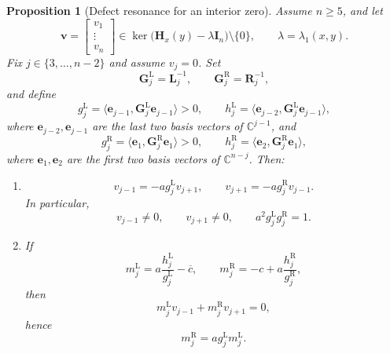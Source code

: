 \documentclass[11pt]{article}
\numberwithin{equation}{section}
\newtheorem{proposition}[theorem]{Proposition}
\begin{document}
\begin{proposition}[Defect resonance for an interior zero]\label{prop:defect}
Assume $n\ge5$, and let
\[
\bm v=
\begin{bmatrix}
v_1\\
\vdots\\
v_n
\end{bmatrix}
\in
\ker\bigl(\mathbf H_x(y)-\lambda\mathbf I_n\bigr)\setminus\{0\},
\qquad
\lambda=\lambda_1(x,y).
\]
Fix $j\in\{3,\dots,n-2\}$ and assume $v_j=0$.
Set
\[
\mathbf G_j^{\mathrm L}=\mathbf L_j^{-1},
\qquad
\mathbf G_j^{\mathrm R}=\mathbf R_j^{-1},
\]
and define
\[
g_j^{\mathrm L}
=
\langle \bm e_{j-1},\mathbf G_j^{\mathrm L}\bm e_{j-1}\rangle>0,
\qquad
h_j^{\mathrm L}
=
\langle \bm e_{j-2},\mathbf G_j^{\mathrm L}\bm e_{j-1}\rangle,
\]
where $\bm e_{j-2},\bm e_{j-1}$ are the last two basis vectors of $\mathbb{C}^{j-1}$,
and
\[
g_j^{\mathrm R}
=
\langle \bm e_1,\mathbf G_j^{\mathrm R}\bm e_1\rangle>0,
\qquad
h_j^{\mathrm R}
=
\langle \bm e_2,\mathbf G_j^{\mathrm R}\bm e_1\rangle,
\]
where $\bm e_1,\bm e_2$ are the first two basis vectors of $\mathbb{C}^{n-j}$.
Then:
\begin{enumerate}
\item
\[
v_{j-1}=-ag_j^{\mathrm L}v_{j+1},
\qquad
v_{j+1}=-ag_j^{\mathrm R}v_{j-1}.
\]
In particular,
\[
v_{j-1}\neq0,
\qquad
v_{j+1}\neq0,
\qquad
a^2g_j^{\mathrm L}g_j^{\mathrm R}=1.
\]

\item
If
\[
m_j^{\mathrm L}=a\frac{h_j^{\mathrm L}}{g_j^{\mathrm L}}-\overline c,
\qquad
m_j^{\mathrm R}=-c+a\frac{h_j^{\mathrm R}}{g_j^{\mathrm R}},
\]
then
\[
m_j^{\mathrm L}v_{j-1}+m_j^{\mathrm R}v_{j+1}=0,
\]
hence
\[
m_j^{\mathrm R}=ag_j^{\mathrm L}m_j^{\mathrm L}.
\]
\end{enumerate}
\end{proposition}
\end{document}
